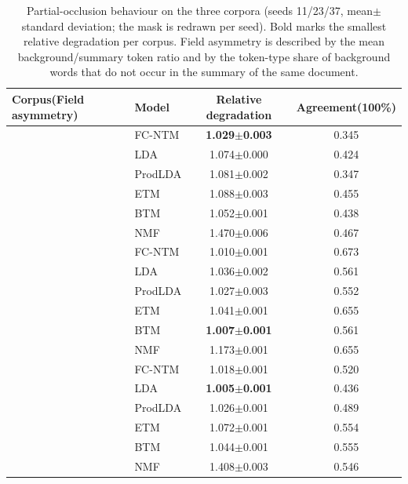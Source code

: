 \documentclass[Journal,letterpaper]{ascelike-new}
\newcommand{\fcntm}{FC-NTM}
\begin{document}
\begin{table}[t]
\centering
\caption{Partial-occlusion behaviour on the three corpora (seeds 11/23/37, mean$\pm$standard deviation; the mask is redrawn per seed). Bold marks the smallest relative degradation per corpus. Field asymmetry is described by the mean background/summary token ratio and by the token-type share of background words that do not occur in the summary of the same document.}
\label{tab:occl-cross}
\small
\setlength{\tabcolsep}{4pt}
\begin{tabular}{@{}llcc@{}}
\toprule
Corpus(Field asymmetry) & Model & Relative degradation & Agreement(100\%) \\
\midrule
{}
 & \fcntm{} & \textbf{1.029$\pm$0.003} & 0.345 \\
 & LDA & 1.074$\pm$0.000 & 0.424 \\
 & ProdLDA & 1.081$\pm$0.002 & 0.347 \\
 & ETM & 1.088$\pm$0.003 & 0.455 \\
 & BTM & 1.052$\pm$0.001 & 0.438 \\
 & NMF & 1.470$\pm$0.006 & 0.467 \\
\midrule
{}
 & \fcntm{} & 1.010$\pm$0.001 & 0.673 \\
 & LDA & 1.036$\pm$0.002 & 0.561 \\
 & ProdLDA & 1.027$\pm$0.003 & 0.552 \\
 & ETM & 1.041$\pm$0.001 & 0.655 \\
 & BTM & \textbf{1.007$\pm$0.001} & 0.561 \\
 & NMF & 1.173$\pm$0.001 & 0.655 \\
\midrule
{}
 & \fcntm{} & 1.018$\pm$0.001 & 0.520 \\
 & LDA & \textbf{1.005$\pm$0.001} & 0.436 \\
 & ProdLDA & 1.026$\pm$0.001 & 0.489 \\
 & ETM & 1.072$\pm$0.001 & 0.554 \\
 & BTM & 1.044$\pm$0.001 & 0.555 \\
 & NMF & 1.408$\pm$0.003 & 0.546 \\
\bottomrule
\end{tabular}
\end{table}
\end{document}
